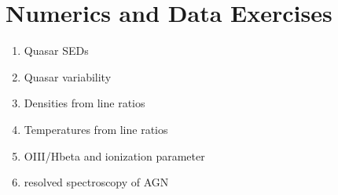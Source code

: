 \section{Numerics and Data Exercises}

\begin{enumerate}
\item Quasar SEDs
\item Quasar variability
\item Densities from line ratios
\item Temperatures from line ratios
\item OIII/Hbeta and ionization parameter
\item resolved spectroscopy of AGN
\end{enumerate}


  
 
